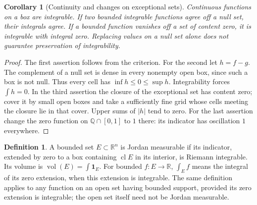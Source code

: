 \documentclass[11pt,oneside,openany]{book}
\newtheorem{corollary}[theorem]{Corollary}
\theoremstyle{definition}
\newtheorem{definition}[theorem]{Definition}
\theoremstyle{remark}
\newcommand{\Q}{\mathbb Q}
\newcommand{\R}{\mathbb R}
\DeclareMathOperator{\vol}{vol}
\DeclareMathOperator{\cl}{cl}
\newcommand{\family}[1]{}
\begin{document}
\begin{corollary}[Continuity and changes on exceptional sets]\label{d04:06:exceptions}
Continuous functions on a box are integrable. If two bounded integrable functions agree off a null set, their integrals agree. If a bounded function vanishes off a set of content zero, it is integrable with integral zero. Replacing values on a null set alone does not guarantee preservation of integrability.
\end{corollary}
\begin{proof}
The first assertion follows from the criterion. For the second let $h=f-g$. The complement of a null set is dense in every nonempty open box, since such a box is not null. Thus every cell has $\inf h\leq0\leq\sup h$. Integrability forces $\int h=0$. In the third assertion the closure of the exceptional set has content zero; cover it by small open boxes and take a sufficiently fine grid whose cells meeting the closure lie in that cover. Upper sums of $|h|$ tend to zero. For the last assertion change the zero function on $\Q\cap[0,1]$ to $1$ there: its indicator has oscillation $1$ everywhere.
\end{proof}

\family{K04.06.07}\family{K04.06.08}
\begin{definition}\label{d04:06:jordan}
A bounded set $E\subset\R^n$ is Jordan measurable if its indicator, extended by zero to a box containing $\cl E$ in its interior, is Riemann integrable. Its volume is $\vol(E)=\int\mathbf1_E$. For bounded $f:E\to\R$, $\int_Ef$ means the integral of its zero extension, when this extension is integrable. The same definition applies to any function on an open set having bounded support, provided its zero extension is integrable; the open set itself need not be Jordan measurable.
\end{definition}
\end{document}
